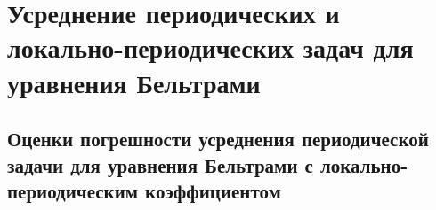 ﻿
\chapter{Усреднение периодических и локально-периодических задач для уравнения Бельтрами}\label{SMM}

\section{Оценки погрешности усреднения периодической задачи для уравнения Бельтрами с локально-периодическим коэффициентом}

%
%
%


